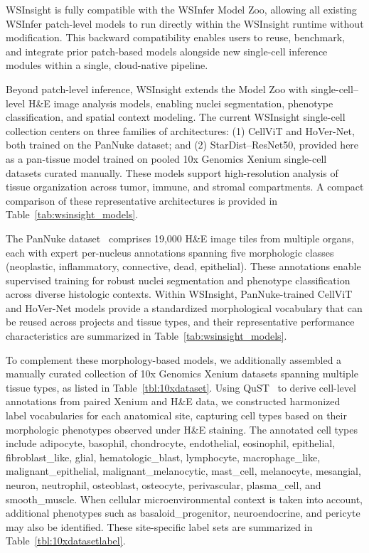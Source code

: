 \documentclass[sn-mathphys-num]{sn-jnl}%
\theoremstyle{thmstyleone}%
\theoremstyle{thmstyletwo}%
\theoremstyle{thmstylethree}%
\begin{document}
	WSInsight is fully compatible with the WSInfer Model Zoo, allowing all existing WSInfer patch-level models to run directly within the WSInsight runtime without modification. This backward compatibility enables users to reuse, benchmark, and integrate prior patch-based models alongside new single-cell inference modules within a single, cloud-native pipeline.

	Beyond patch-level inference, WSInsight extends the Model Zoo with single-cell–level H\&E image analysis models, enabling nuclei segmentation, phenotype classification, and spatial context modeling. The current WSInsight single-cell collection centers on three families of architectures: (1) CellViT and HoVer-Net, both trained on the PanNuke dataset; and (2) StarDist–ResNet50, provided here as a pan-tissue model trained on pooled 10x Genomics Xenium single-cell datasets curated manually. These models support high-resolution analysis of tissue organization across tumor, immune, and stromal compartments. A compact comparison of these representative architectures is provided in Table~\ref{tab:wsinsight_models}.

	The PanNuke dataset~\cite{Gamper:2019} comprises 19{,}000 H\&E image tiles from multiple organs, each with expert per-nucleus annotations spanning five morphologic classes (neoplastic, inflammatory, connective, dead, epithelial). These annotations enable supervised training for robust nuclei segmentation and phenotype classification across diverse histologic contexts. Within WSInsight, PanNuke-trained CellViT and HoVer-Net models provide a standardized morphological vocabulary that can be reused across projects and tissue types, and their representative performance characteristics are summarized in Table~\ref{tab:wsinsight_models}.

	To complement these morphology-based models, we additionally assembled a manually curated collection of 10x Genomics Xenium datasets spanning multiple tissue types, as listed in Table~\ref{tbl:10xdataset}. Using QuST~\cite{Huang:2025} to derive cell-level annotations from paired Xenium and H\&E data, we constructed harmonized label vocabularies for each anatomical site, capturing cell types based on their morphologic phenotypes observed under H\&E staining. The annotated cell types include adipocyte, basophil, chondrocyte, endothelial, eosinophil, epithelial, fibroblast\_like, glial, hematologic\_blast, lymphocyte, macrophage\_like, malignant\_epithelial, malignant\_melanocytic, mast\_cell, melanocyte, mesangial, neuron, neutrophil, osteoblast, osteocyte, perivascular, plasma\_cell, and smooth\_muscle. When cellular microenvironmental context is taken into account, additional phenotypes such as basaloid\_progenitor, neuroendocrine, and pericyte may also be identified. These site-specific label sets are summarized in Table~\ref{tbl:10xdatasetlabel}.  
	
\end{document}
